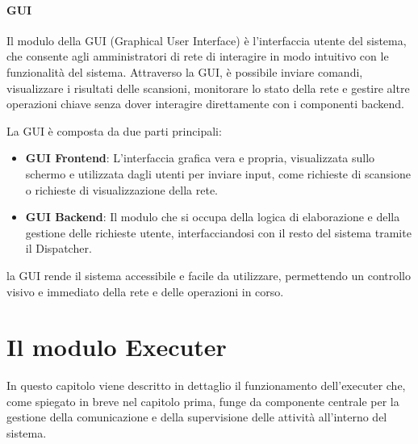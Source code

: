 \documentclass[target=bach,aauheader=,style=]{thud}
\begin{document}
\FloatBarrier


\subsubsection{GUI} 
Il modulo della GUI (Graphical User Interface) è l'interfaccia utente del sistema, che consente agli amministratori di rete di interagire in modo intuitivo con le funzionalità del sistema. Attraverso la GUI, è possibile inviare comandi, visualizzare i risultati delle scansioni, monitorare lo stato della rete e gestire altre operazioni chiave senza dover interagire direttamente con i componenti backend.

La GUI è composta da due parti principali:

\begin{itemize}
  \item \textbf{GUI Frontend}: L'interfaccia grafica vera e propria, visualizzata sullo schermo e utilizzata dagli utenti per inviare input, come richieste di scansione o richieste di visualizzazione della rete.
  \item \textbf{GUI Backend}: Il modulo che si occupa della logica di elaborazione e della gestione delle richieste utente, interfacciandosi con il resto del sistema tramite il Dispatcher.
\end{itemize}

la GUI rende il sistema accessibile e facile da utilizzare, permettendo un controllo visivo e immediato della rete e delle operazioni in corso.

\FloatBarrier

\chapter{Il modulo Executer}
In questo capitolo viene descritto in dettaglio il funzionamento dell'executer che, come spiegato in breve nel capitolo prima, funge da componente centrale per la gestione della comunicazione e della supervisione delle attività all'interno del sistema.
\end{document}
